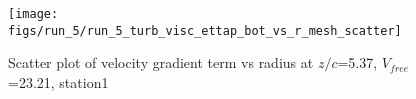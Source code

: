 \begin{figure}[H]
\centering
\texttt{[image: figs/run\_5/run\_5\_turb\_visc\_ettap\_bot\_vs\_r\_mesh\_scatter]}
\caption{Scatter plot of velocity gradient term vs radius at $z/c$=5.37, $V_{free}$=23.21, station1}
\label{fig:run_5_turb_visc_ettap_bot_vs_r_mesh_scatter}
\end{figure}



